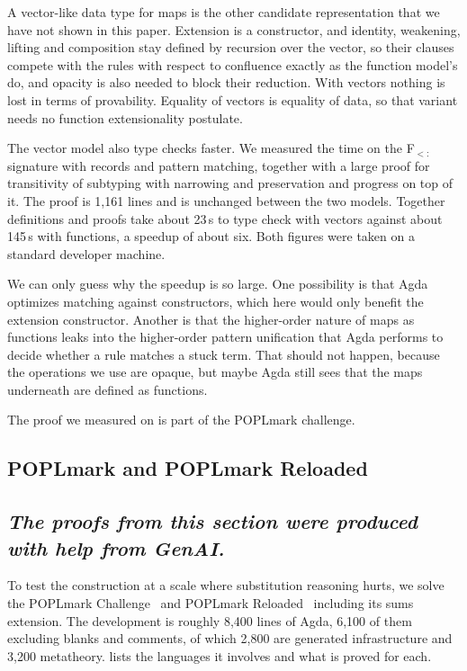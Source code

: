 \documentclass[sigplan,anonymous,review]{acmart}
\theoremstyle{acmdefinition}
\begin{document}
A vector-like data type for maps is the other candidate representation that we
have not shown in this paper. Extension is a constructor, and identity,
weakening, lifting and composition stay defined by recursion over the vector,
so their clauses compete with the rules with respect to confluence exactly as
the function model's do, and opacity is also needed to block their reduction.
With vectors nothing is lost in terms of provability. Equality of vectors is
equality of data, so that variant needs no function extensionality postulate.

The vector model also type checks faster. We measured the time on the F$_{<:}$
signature with records and pattern matching, together with a large proof for
transitivity of subtyping with narrowing and preservation and progress on top
of it. The proof is 1{,}161 lines and is unchanged between the two models.
Together definitions and proofs take about 23\,s to type check with vectors
against about 145\,s with functions, a speedup of about six. Both figures were
taken on a standard developer machine.

We can only guess why the speedup is so large. One possibility is that Agda
optimizes matching against constructors, which here would only benefit the
extension constructor. Another is that the higher-order nature of maps as
functions leaks into the higher-order pattern unification that Agda performs to
decide whether a rule matches a stuck term. That should not happen, because the
operations we use are opaque, but maybe Agda still sees that the maps
underneath are defined as functions.

The proof we measured on is part of the POPLmark challenge.

\subsection{POPLmark and POPLmark Reloaded}\label{sec:eval}
\subsection*{\emph{The proofs from this section were produced with help from GenAI.}}

To test the construction at a scale where substitution reasoning hurts, we
solve the POPLmark Challenge~\cite{poplmark2005} and POPLmark
Reloaded~\cite{poplmarkreloaded2019} including its sums extension. The
development is roughly 8,400 lines of Agda, 6,100 of them excluding blanks and
comments, of which 2,800 are generated infrastructure and 3,200 metatheory.
 lists the languages it involves and what is proved for
each.
\end{document}

